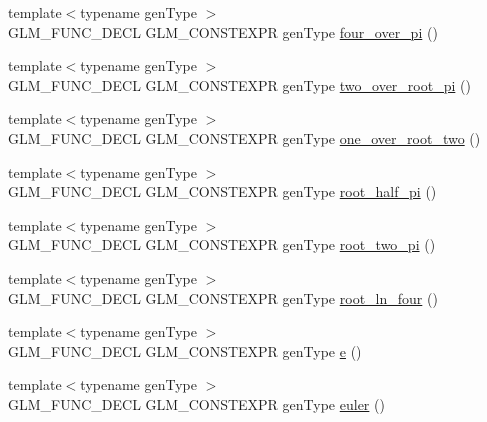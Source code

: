 \begin{DoxyCompactItemize}
\item 
{\footnotesize template$<$typename gen\+Type $>$ }\\G\+L\+M\+\_\+\+F\+U\+N\+C\+\_\+\+D\+E\+C\+L G\+L\+M\+\_\+\+C\+O\+N\+S\+T\+E\+X\+P\+R gen\+Type \hyperlink{group__gtc__constants_ga753950e5140e4ea6a88e4a18ba61dc09}{four\+\_\+over\+\_\+pi} ()
\item 
{\footnotesize template$<$typename gen\+Type $>$ }\\G\+L\+M\+\_\+\+F\+U\+N\+C\+\_\+\+D\+E\+C\+L G\+L\+M\+\_\+\+C\+O\+N\+S\+T\+E\+X\+P\+R gen\+Type \hyperlink{group__gtc__constants_ga5827301817640843cf02026a8d493894}{two\+\_\+over\+\_\+root\+\_\+pi} ()
\item 
{\footnotesize template$<$typename gen\+Type $>$ }\\G\+L\+M\+\_\+\+F\+U\+N\+C\+\_\+\+D\+E\+C\+L G\+L\+M\+\_\+\+C\+O\+N\+S\+T\+E\+X\+P\+R gen\+Type \hyperlink{group__gtc__constants_ga788fa23a0939bac4d1d0205fb4f35818}{one\+\_\+over\+\_\+root\+\_\+two} ()
\item 
{\footnotesize template$<$typename gen\+Type $>$ }\\G\+L\+M\+\_\+\+F\+U\+N\+C\+\_\+\+D\+E\+C\+L G\+L\+M\+\_\+\+C\+O\+N\+S\+T\+E\+X\+P\+R gen\+Type \hyperlink{group__gtc__constants_ga4e276cb823cc5e612d4f89ed99c75039}{root\+\_\+half\+\_\+pi} ()
\item 
{\footnotesize template$<$typename gen\+Type $>$ }\\G\+L\+M\+\_\+\+F\+U\+N\+C\+\_\+\+D\+E\+C\+L G\+L\+M\+\_\+\+C\+O\+N\+S\+T\+E\+X\+P\+R gen\+Type \hyperlink{group__gtc__constants_ga2bcedc575039fe0cd765742f8bbb0bd3}{root\+\_\+two\+\_\+pi} ()
\item 
{\footnotesize template$<$typename gen\+Type $>$ }\\G\+L\+M\+\_\+\+F\+U\+N\+C\+\_\+\+D\+E\+C\+L G\+L\+M\+\_\+\+C\+O\+N\+S\+T\+E\+X\+P\+R gen\+Type \hyperlink{group__gtc__constants_ga4129412e96b33707a77c1a07652e23e2}{root\+\_\+ln\+\_\+four} ()
\item 
{\footnotesize template$<$typename gen\+Type $>$ }\\G\+L\+M\+\_\+\+F\+U\+N\+C\+\_\+\+D\+E\+C\+L G\+L\+M\+\_\+\+C\+O\+N\+S\+T\+E\+X\+P\+R gen\+Type \hyperlink{group__gtc__constants_ga4b7956eb6e2fbedfc7cf2e46e85c5139}{e} ()
\item 
{\footnotesize template$<$typename gen\+Type $>$ }\\G\+L\+M\+\_\+\+F\+U\+N\+C\+\_\+\+D\+E\+C\+L G\+L\+M\+\_\+\+C\+O\+N\+S\+T\+E\+X\+P\+R gen\+Type \hyperlink{group__gtc__constants_gad8fe2e6f90bce9d829e9723b649fbd42}{euler} ()

\end{DoxyCompactItemize}
